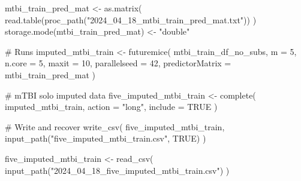 \documentclass[
  letterpaper,
  DIV=11,
  numbers=noendperiod]{scrreprt}
\newenvironment{Shaded}{\begin{snugshade}}{\end{snugshade}}
\newcommand{\AttributeTok}[1]{\textcolor[rgb]{0.40,0.45,0.13}{#1}}
\newcommand{\CommentTok}[1]{\textcolor[rgb]{0.37,0.37,0.37}{#1}}
\newcommand{\ConstantTok}[1]{\textcolor[rgb]{0.56,0.35,0.01}{#1}}
\newcommand{\DecValTok}[1]{\textcolor[rgb]{0.68,0.00,0.00}{#1}}
\newcommand{\FunctionTok}[1]{\textcolor[rgb]{0.28,0.35,0.67}{#1}}
\newcommand{\NormalTok}[1]{\textcolor[rgb]{0.00,0.23,0.31}{#1}}
\newcommand{\OtherTok}[1]{\textcolor[rgb]{0.00,0.23,0.31}{#1}}
\newcommand{\StringTok}[1]{\textcolor[rgb]{0.13,0.47,0.30}{#1}}
\begin{document}
\begin{Shaded}
\begin{Highlighting}[]
\NormalTok{mtbi\_train\_pred\_mat }\OtherTok{\textless{}{-}} \FunctionTok{as.matrix}\NormalTok{(}
    \FunctionTok{read.table}\NormalTok{(}\FunctionTok{proc\_path}\NormalTok{(}\StringTok{"2024\_04\_18\_mtbi\_train\_pred\_mat.txt"}\NormalTok{))}
\NormalTok{)}
\FunctionTok{storage.mode}\NormalTok{(mtbi\_train\_pred\_mat) }\OtherTok{\textless{}{-}} \StringTok{"double"}

\CommentTok{\# Runs}
\NormalTok{imputed\_mtbi\_train }\OtherTok{\textless{}{-}} \FunctionTok{futuremice}\NormalTok{(}
\NormalTok{    mtbi\_train\_df\_no\_subs,}
    \AttributeTok{m =} \DecValTok{5}\NormalTok{,}
    \AttributeTok{n.core =} \DecValTok{5}\NormalTok{,}
    \AttributeTok{maxit =} \DecValTok{10}\NormalTok{,}
    \AttributeTok{parallelseed =} \DecValTok{42}\NormalTok{,}
    \AttributeTok{predictorMatrix =}\NormalTok{ mtbi\_train\_pred\_mat}
\NormalTok{)}

\CommentTok{\# mTBI solo imputed data}
\NormalTok{five\_imputed\_mtbi\_train }\OtherTok{\textless{}{-}} \FunctionTok{complete}\NormalTok{(}
\NormalTok{    imputed\_mtbi\_train,}
    \AttributeTok{action =} \StringTok{"long"}\NormalTok{,}
    \AttributeTok{include =} \ConstantTok{TRUE}
\NormalTok{)}

\CommentTok{\# Write and recover}
\FunctionTok{write\_csv}\NormalTok{(}
\NormalTok{    five\_imputed\_mtbi\_train,}
    \FunctionTok{input\_path}\NormalTok{(}\StringTok{"five\_imputed\_mtbi\_train.csv"}\NormalTok{, }\ConstantTok{TRUE}\NormalTok{)}
\NormalTok{)}

\NormalTok{five\_imputed\_mtbi\_train }\OtherTok{\textless{}{-}} \FunctionTok{read\_csv}\NormalTok{(}
    \FunctionTok{input\_path}\NormalTok{(}\StringTok{"2024\_04\_18\_five\_imputed\_mtbi\_train.csv"}\NormalTok{)}
\NormalTok{)}


\end{Highlighting}
\end{Shaded}
\end{document}
